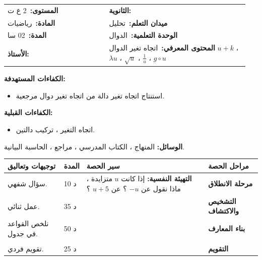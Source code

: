 \documentclass[12pt,a4paper]{article}
\makeatletter
\newenvironment{LTR}{\begin{otherlanguage}{english}}{\end{otherlanguage}}
\newcommand{\ar}[1]{\foreignlanguage{arabic}{#1}}
\newcommand{\Phase}[1]{\textbf{#1}}
\newcommand{\Fld}[2]{\textbf{#1:}\ #2}
\newcommand{\ModhHead}[9]{%
\begin{LTR}
\begin{tcolorbox}[enhanced,colback=white,colframe=cThm!85!black,arc=4mm,boxrule=1pt,top=14pt,bottom=6pt,left=8pt,right=8pt,
 overlay={\node[fill=cThm!85!black,text=white,rounded corners=3mm,inner xsep=14pt,inner ysep=4pt,font=\large\bfseries] at ([yshift=0pt]frame.north){\ar{مذكرة رقم #1}};},
 before upper={\selectlanguage{arabic}}]
\begin{tabular}{@{}p{0.4\linewidth}p{0.55\linewidth}@{}}
\Fld{المستوى}{#2} & \Fld{الثانوية}{\dotfill}\\[3pt]
\Fld{المادة}{رياضيات} & \Fld{ميدان التعلم}{#3}\\[3pt]
\Fld{المدة}{#5} & \Fld{الوحدة التعلمية}{#4}\\[3pt]
\Fld{الأستاذ}{\dotfill} & \Fld{المحتوى المعرفي}{#6}\\
\end{tabular}
\end{tcolorbox}
\begin{tcolorbox}[enhanced,colback=white,colframe=cThm!85!black,arc=3mm,boxrule=0.8pt,sidebyside,sidebyside align=top,lefthand ratio=0.5,
 segmentation style={dashed,cThm!60},before upper={\selectlanguage{arabic}},before lower={\selectlanguage{arabic}}]
\textbf{الكفاءات المستهدفة:}\par #8
\tcblower
\textbf{الكفاءات القبلية:}\par #7
\end{tcolorbox}
\end{LTR}
\par\smallskip\textbf{الوسائل:} #9\par\smallskip}
\newenvironment{Sayr}{%
\begin{LTR}\renewcommand{\arraystretch}{1.25}
\begin{longtable}{|p{0.17\textwidth}|>{\centering\arraybackslash}p{0.06\textwidth}|p{0.53\textwidth}|>{\centering\arraybackslash}p{0.12\textwidth}|}
\hline\rowcolor{cThm!12}\ar{\textbf{توجيهات وتعاليق}} & \ar{\textbf{المدة}} & \ar{\textbf{سير الحصة}} & \ar{\textbf{مراحل الحصة}}\\\hline\endhead
\hline\endfoot}{\end{longtable}\end{LTR}}
\newcommand{\Row}[4]{\ar{\small #4} & \ar{#3} & \ar{#2} & \cellcolor{cThm!8}\ar{\Phase{#1}}\\\hline}
\newcommand{\Lab}[2]{\foreignlanguage{english}{\tcbox[on line,colback=#1,colframe=#1,boxrule=0pt,arc=2pt,boxsep=1pt,left=5pt,right=5pt,top=1pt,bottom=1pt]{\ar{\textcolor{white}{\textbf{#2}}}}}}
\newcommand{\ck}{\ensuremath{{\color{cRem}\checkmark}}}
\makeatother
\begin{document}
\newpage
\ModhHead{04}{2 ع ت}{تحليل}{الدوال}{02 سا}{اتجاه تغير الدوال $u+k$ ، $\lambda u$ ، $\sqrt u$ ، $\frac1u$ ، $g\circ u$}%
{\begin{itemize}\item اتجاه التغير ، تركيب دالتين.\end{itemize}}%
{\begin{itemize}\item استنتاج اتجاه تغير دالة من اتجاه تغير دوال مرجعية.\end{itemize}}%
{المنهاج ، الكتاب المدرسي ، مراجع ، الحاسبة البيانية.}
\begin{Sayr}
\Row{مرحلة الانطلاق}{%
\textbf{التهيئة النفسية:} إذا كانت $u$ متزايدة ، ماذا نقول عن $-u$ ؟ عن $u+5$ ؟}{10 د}{سؤال شفهي.}
\Row{التشخيص والاكتشاف}{%
\Lab{cEx}{مناقشة نشاط 04 صفحة 9}\par\ck\ دالتان تآلفيتان $f$ و $g$: اتجاه تغير كل منهما ، ثم اتجاه تغير دوال مشكلة منهما.\par
\ck\ نلاحظ أن ضرب دالة في عدد سالب يعكس اتجاه التغير.\par
}{35 د}{عمل ثنائي.}
\Row{بناء المعارف}{%
\Lab{cThm}{خاصية}\ $u$ دالة رتيبة على مجال $I$:\par\ck\ $u+k$ لها نفس اتجاه تغير $u$.\par
\ck\ $\lambda u$: نفس الاتجاه إذا $\lambda>0$ ، وعكسه إذا $\lambda<0$.\par
\ck\ إذا كانت $u\geqslant0$ على $I$: $\sqrt u$ لها نفس اتجاه تغير $u$.\par
\ck\ إذا كانت $u$ لا تنعدم وتحافظ على إشارة ثابتة على $I$: $\dfrac1u$ لها عكس اتجاه تغير $u$.\par
\Lab{cThm}{مركب دالتين}\ إذا كانت $u$ رتيبة على $I$ و $g$ رتيبة على $J$ مع $u(x)\in J$: $g\circ u$ متزايدة إذا كان لهما نفس الاتجاه ، ومتناقصة إذا اختلف الاتجاهان.\par}{50 د}{نلخص القواعد في جدول.}
\Row{}{%
\Lab{cEx}{مثال}\par\ck\ $f(x)=\dfrac1{x-2}$ على $]2;+\infty[$: $u(x)=x-2$ متزايدة وموجبة ، إذن $f$ متناقصة.\par
\ck\ $f(x)=\sqrt{3-x}$ على $]-\infty;3]$: $u(x)=3-x$ متناقصة وموجبة ، إذن $f$ متناقصة.\par
\Lab{cThm!80!black}{حذار}\ القاعدة $\frac1u$ لا تُطبق على مجال تنعدم فيه $u$.}{}{}
\Row{التقويم}{%
\Lab{cEx}{تطبيق}\par ادرس اتجاه تغير $h(x)=-2(x-1)^2+3$ على $[1;+\infty[$.\par\textbf{الحل:} $x-1$ متزايدة وموجبة ، والدالة مربع متزايدة على $[0;+\infty[$ ، إذن $(x-1)^2$ متزايدة ؛ الضرب في $-2$ يعكس الاتجاه ، وإضافة $3$ لا تغيره: $h$ متناقصة على $[1;+\infty[$.\par\textbf{واجب منزلي:} تمارين من الكتاب المدرسي.\par\smallskip\textbf{ملاحظات حول سير الحصة:} \dotfill}{25 د}{تقويم فردي.}
\end{Sayr}
\end{document}
